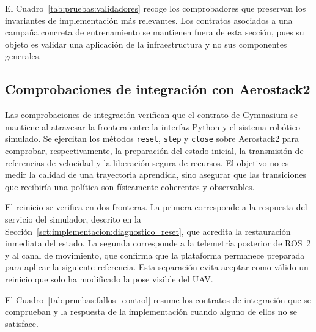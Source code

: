 El Cuadro~\ref{tab:pruebas:validadores} recoge los comprobadores que preservan
los invariantes de implementación más relevantes. Los contratos asociados a una
campaña concreta de entrenamiento se mantienen fuera de esta sección, pues su
objeto es validar una aplicación de la infraestructura y no sus componentes
generales.

\subsection{Comprobaciones de integración con Aerostack2}
\label{sct:pruebas:as2_reset}

Las comprobaciones de integración verifican que el contrato de Gymnasium se
mantiene al atravesar la frontera entre la interfaz Python y el sistema robótico
simulado. Se ejercitan los métodos \texttt{reset}, \texttt{step} y
\texttt{close} sobre Aerostack2 para comprobar, respectivamente, la preparación
del estado inicial, la transmisión de referencias de velocidad y la liberación
segura de recursos. El objetivo no es medir la calidad de una trayectoria
aprendida, sino asegurar que las transiciones que recibiría una política son
físicamente coherentes y observables.

El reinicio se verifica en dos fronteras. La primera corresponde a la respuesta
del servicio del simulador, descrito en la
Sección~\ref{sct:implementacion:diagnostico_reset}, que acredita la restauración
inmediata del estado. La segunda corresponde a la telemetría posterior de
ROS~2 y al canal de movimiento, que confirma que la plataforma permanece
preparada para aplicar la siguiente referencia. Esta separación evita aceptar
como válido un reinicio que solo ha modificado la pose visible del UAV.

El Cuadro~\ref{tab:pruebas:fallos_control} resume los contratos de integración
que se comprueban y la respuesta de la implementación cuando alguno de ellos no
se satisface.

